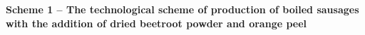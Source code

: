 












{\bfseries Scheme 1 -- The technological scheme of production of boiled sausages with the addition of dried beetroot powder and orange peel}

